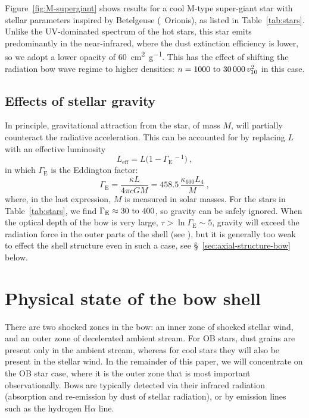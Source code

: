 Figure~\ref{fig:M-supergiant} shows results for a cool M-type
super-giant star with stellar parameters inspired by Betelgeuse
(\chemalpha~Orionis), as listed in Table~\ref{tab:stars}.  Unlike the
UV-dominated spectrum of the hot stars, this star emits predominantly
in the near-infrared, where the dust extinction efficiency is lower,
so we adopt a lower opacity of \SI{60}{cm^2.g^{-1}}.  This has the
effect of shifting the radiation bow wave regime to higher densities:
\(n = \text{\numrange{1000}{30 000}}\, v_{10}^2\) in this case.


\subsection{Effects of stellar gravity}
\label{sec:effects-gravity}

In principle, gravitational attraction from the star, of mass \(M\),
will partially counteract the radiative acceleration.  This can be
accounted for by replacing \(L\) with an effective luminosity
\newcommand\Edd{\ensuremath{_{\text{E}}}}
\begin{equation}
  \label{eq:effective-luminosity}
  L_{\text{eff}} = L \bigl(1 - \Gamma\Edd^{\,-1}\bigr) \ ,
\end{equation}
in which \(\Gamma\Edd\) is the Eddington factor:
\begin{equation}
  \label{eq:eddington-factor}
  \Gamma\Edd = \frac{\kappa L}{4\pi c G M} = 458.5 \, \frac{\kappa_{600} L_4}{ M } \ ,
\end{equation}
where, in the last expression, \(M\) is measured in solar masses.  For
the stars in Table~\ref{tab:stars}, we find
\(\Gamma\Edd \approx \text{\numrange{30}{400}}\), so gravity can be safely
ignored.  When the optical depth of the bow is very large,
\(\tau > \ln\Gamma\Edd \sim 5\), gravity will exceed the radiation force in the
outer parts of the shell (see \citealt{Rodriguez-Ramirez:2016b}), but
it is generally too weak to effect the shell structure even in such a
case, see \S~\ref{sec:axial-structure-bow} below.


\section{Physical state of the bow shell}
\label{sec:phys-state-shock}

There are two shocked zones in the bow: an inner zone of shocked
stellar wind, and an outer zone of decelerated ambient stream. For OB
stars, dust grains are present only in the ambient stream, whereas for
cool stars they will also be present in the stellar wind.  In the
remainder of this paper, we will concentrate on the OB star case,
where it is the outer zone that is most important observationally.
Bows are typically detected via their infrared radiation (absorption
and re-emission by dust of stellar radiation), or by emission lines
such as the hydrogen H\(\alpha\) line.

